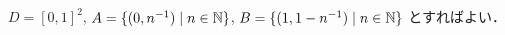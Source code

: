 \subsection{}
$D = [0,1]^2$, $A = \{(0,n^{-1})\mid n\in \mathbb{N}\}$, $B = \{(1, 1-n^{-1})\mid n\in \mathbb{N}\}$ とすればよい．